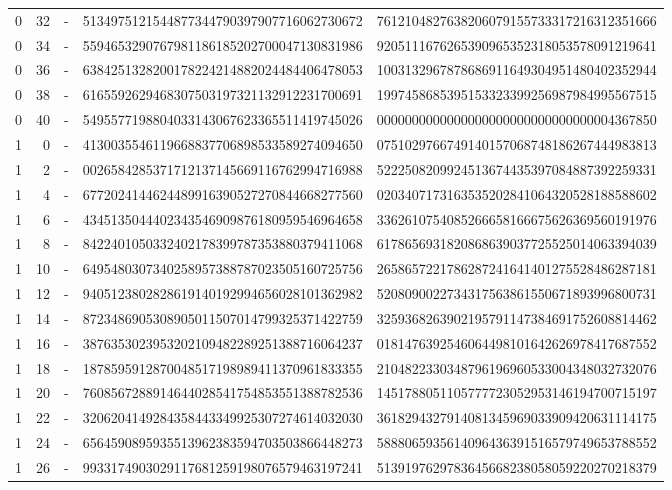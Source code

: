 \begin{longtable}{rrrll}
0 & 32 & - & 5134975121544877344790397907716062730672 & 7612104827638206079155733317216312351666 \\
0 & 34 & - & 5594653290767981186185202700047130831986 & 9205111676265390965352318053578091219641 \\
0 & 36 & - & 6384251328200178224214882024484406478053 & 1003132967878686911649304951480402352944 \\
0 & 38 & - & 6165592629468307503197321132912231700691 & 1997458685395153323399256987984995567515 \\
0 & 40 & - & 5495577198804033143067623365511419745026 & 0000000000000000000000000000000004367850 \\
1 & 0 & - & 4130035546119668837706898533589274094650 & 0751029766749140157068748186267444983813 \\
1 & 2 & - & 0026584285371712137145669116762994716988 & 5222508209924513674435397084887392259331 \\
1 & 4 & - & 6772024144624489916390527270844668277560 & 0203407173163535202841064320528188588602 \\
1 & 6 & - & 4345135044402343546909876180959546964658 & 3362610754085266658166675626369560191976 \\
1 & 8 & - & 8422401050332402178399787353880379411068 & 6178656931820868639037725525014063394039 \\
1 & 10 & - & 6495480307340258957388787023505160725756 & 2658657221786287241641401275528486287181 \\
1 & 12 & - & 9405123802828619140192994656028101362982 & 5208090022734317563861550671893996800731 \\
1 & 14 & - & 8723486905308905011507014799325371422759 & 3259368263902195791147384691752608814462 \\
1 & 16 & - & 3876353023953202109482289251388716064237 & 0181476392546064498101642626978417687552 \\
1 & 18 & - & 1878595912870048517198989411370961833355 & 2104822330348796196960533004348032732076 \\
1 & 20 & - & 7608567288914644028541754853551388782536 & 1451788051105777723052953146194700715197 \\
1 & 22 & - & 3206204149284358443349925307274614032030 & 3618294327914081345969033909420631114175 \\
1 & 24 & - & 6564590895935513962383594703503866448273 & 5888065935614096436391516579749653788552 \\
1 & 26 & - & 9933174903029117681259198076579463197241 & 5139197629783645668238058059220270218379 \\

\end{longtable}

